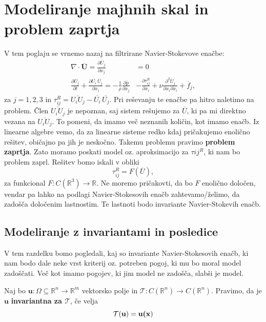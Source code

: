 \documentclass[mat2, tisk]{fmfdelo}
\newcommand{\R}{\mathbb R}
\newcommand{\bd}{\textbf}
\begin{document}
\section{Modeliranje majhnih skal in problem zaprtja}
V tem poglaju se vrnemo nazaj na filtrirane Navier-Stokevove enačbe: 
\begin{align*}
  \nabla\cdot\overline{\bd{U}} = \frac{\partial \overline{U}_j}{\partial x_j} &= 0\\[2mm]
  \frac{\partial \overline{U}_j}{\partial t} + \frac{\partial \overline{U_i}\, \overline{U_j}}{\partial x_i} = -\frac{1}{\rho} \frac{\partial \overline{p}}{\partial x_j}& 
- \frac{\partial \tau_{ij}^{R}}{\partial x_i}+ \nu \frac{\partial^2 \overline{U}_j}{\partial x_i \partial x_i} + \overline{f}_j,
\end{align*}
za $j=1, 2, 3$ in $\tau_{ij}^R = \overline{U_i U_j} - \overline{U_i} \,\overline{U_j}$. 
Pri reševanju te enačbe pa hitro naletimo na problem. Člen $\overline{U_i U_j}$ 
je nepoznan, saj sistem rešujemo za $\overline{U}$, ki pa mi direktno vezana na $\overline{U_i U_j}$. 
To pomeni, da imamo več neznanih količin, kot imamo enačb. Iz linearne algebre 
vemo, da za linearne sisteme redko kdaj pričakujemo enolično rešitev, 
običajno pa jih je neskočno. Takemu problemu pravimo \bd{problem zaprtja}.
Zato moramo poskati model oz. aproksimacijo za $\tau{ij}^R$, ki nam bo problem 
zaprl. Rešitev bomo iskali v obliki 
\begin{equation}
\tau_{ij}^R = F(\overline{U}), 
\end{equation}
za funkcional $F: C(\R^3) \rightarrow \R$. Ne moremo pričakovti, da 
bo $F$ enolično določen, vendar pa lahko na podlagi Navier-Stokesovih enačb zahtevamo/želimo,
da zadošča določenim lastnostim. Te lastnoti bodo invariante Navier-Stokevih enačb.

\subsection{Modeliranje z invariantami in posledice}

V tem razdelku bomo pogledali, kaj so invariante Navier-Stokesovih 
enačb, ki nam bodo dale neke vrst kriterij oz. potreben pogoj, ki 
mu bo moral model zadoščati. Več kot imamo pogojev, ki jim model 
ne zadošča, slabši je model.

\begin{definicija}
Naj bo $\bd{u}: \Omega \subseteq \R^n \rightarrow \R^m$ vektorsko polje 
in $\mathcal{T}:C(\R^n) \rightarrow C(\R^n)$. Pravimo, da je $\bd{u}$
\bd{invariantna za $\mathcal{T}$}, če velja
\begin{equation}
\mathcal{T}(\bd{u}) = \bd{u(\bd{x}})
\end{equation}
\end{definicija}
\end{document}
